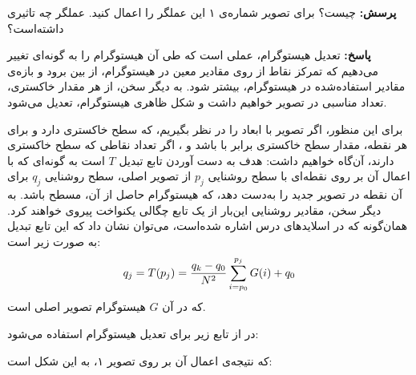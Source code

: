 \documentclass[12pt,a4paper]{article}
\theoremstyle{definition}
\theoremstyle{theorem}
\theoremstyle{definition}
\begin{document}
\textbf{پرسش: }
چیست؟ برای تصویر شماره‌ی ۱ این عملگر را اعمال کنید. عملگر چه تاثیری داشته‌است؟ 


\textbf{پاسخ: } 
تعدیل هیستوگرام، عملی است که طی آن هیستوگرام را به گونه‌ای تغییر می‌دهیم که تمرکز نقاط از روی مقادیر معین در هیستوگرام، از بین برود و بازه‌ی مقادیر استفاده‌شده در هیستوگرام، بیشتر شود. به دیگر سخن، از هر مقدار خاکستری، تعداد مناسبی در تصویر خواهیم داشت و شکل ظاهری هیستوگرام، تعدیل می‌شود. 

برای این منظور، اگر تصویر با ابعاد 
را در نظر بگیریم، که 
سطح خاکستری دارد و برای هر نقطه، مقدار سطح خاکستری برابر با 
باشد و 
، اگر تعداد نقاطی که سطح خاکستری
دارند، 
آن‌گاه خواهیم داشت: 
\lr{
\[ p(r_k) = { {n_k} \over {N^2} } \phantom{ba}, \phantom{ba} k=0,1,...,L-1 \]
}
هدف به دست آوردن تابع تبدیل \( T\) است به گونه‌ای که با اعمال آن بر روی نقطه‌ای با سطح روشنایی \(p_j\) از تصویر اصلی، سطح روشنایی \(q_j\) برای آن نقطه در تصویر جدید را به‌دست دهد، که هیستوگرام حاصل از آن، مسطح باشد. به دیگر سخن، مقادیر روشنایی این‌بار از یک تابع چگالی یکنواخت پیروی خواهند کرد. همان‌گونه که در اسلاید‌های درس اشاره شده‌است، می‌توان نشان داد که این تابع تبدیل به صورت زیر است:
\vspace{0.2cm}
\begin{equation}
\label{histeq}
 q_j = T(p_j) = {{q_k - q_0} \over {N^2} } \sum_{i=p_0}^{p_j}{G(i)+q_0} 
\end{equation}
که در آن \(G\) هیستوگرام تصویر اصلی است.

در  از تابع زیر برای تعدیل هیستوگرام استفاده می‌شود:


که نتیجه‌ی اعمال آن بر روی تصویر ۱، به این شکل است:
\end{document}
